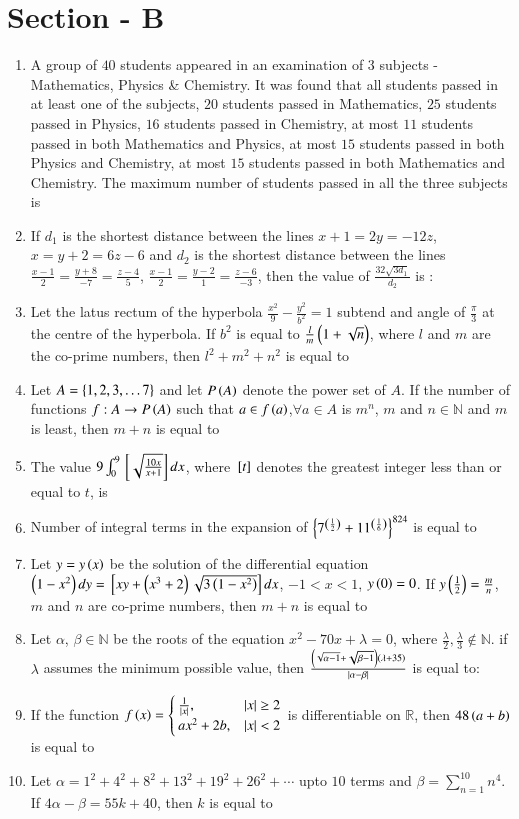 \documentclass[journal]{IEEEtran}
\begin{document}
\section{Section - B}
\begin{enumerate}
	\item A group of $40$ students appeared in an examination of $3$ subjects - Mathematics, Physics \& Chemistry. It was found that all students passed in at least one of the subjects, $20$ students passed in Mathematics, $25$ students passed in Physics, $16$ students passed in Chemistry, at most $11$ students passed in both Mathematics and Physics, at most $15$ students passed in both Physics and Chemistry, at most $15$ students passed in both Mathematics and Chemistry. The maximum number of students passed in all the three subjects is 
	\item If $d_1$ is the shortest distance between the lines $x + 1 = 2y = -12z$, $x = y + 2 = 6z - 6$ and $d_2$ is the shortest distance between the lines $\frac{x-1}{2}=\frac{y+8}{-7}=\frac{z-4}{5}$, $\frac{x-1}{2}=\frac{y-2}{1}=\frac{z-6}{-3}$, then the value of $\frac{32\sqrt{3d_1}}{d_2}$ is :
	\item Let the latus rectum of the hyperbola $\frac{x^2}{9}-\frac{y^2}{b^2}=1$ subtend and angle of $\frac{\pi}{3}$ at the centre of the hyperbola. If $b^2$ is equal to $\frac{l}{m}\left(1+\sqrt{n}\right)$, where $l$ and $m$ are the co-prime numbers, then $l^2+m^2+n^2$ is equal to
	\item Let $A = \left\{1, 2, 3, \dots 7\right\}$ and let $P\left(A\right)$ denote the power set of $A$. If the number of functions $f:A\to P\left(A\right)$ such that $a\in f\left(a\right)$,$\forall a\in A$ is $m^n$, $m$ and $n\in\mathbb{N}$ and $m$ is least, then $m+n$ is equal to
	\item The value $9\int_0^9{}\left[\sqrt{\frac{10x}{x+1}}\right]dx$, where ${}\left[t\right]$ denotes the greatest integer less than or equal to $t$, is 
	\item Number of integral terms in the expansion of $\left\{7^{\left(\frac{1}{2}\right)}+11^{\left(\frac{1}{6}\right)}\right\}^{824}$ is equal to
	\item Let $y = y\left(x\right)$ be the solution of the differential equation $\left(1-x^2\right)dy={}\left[xy+\left(x^3+2\right)\sqrt{3\left(1-x^2\right)}\right]dx$, $-1<x<1$, $y\left(0\right)=0$. If $y\left(\frac{1}{2}\right)=\frac{m}{n}$, $m$ and $n$ are co-prime numbers, then $m+n$ is equal to 
	\item Let $\alpha$, $\beta \in \mathbb{N}$ be the roots of the equation $x^2-70x+\lambda=0$, where $\frac{\lambda}{2},\frac{\lambda}{3}\notin \mathbb{N}$. if $\lambda$ assumes the minimum possible value, then $\frac{\left(\sqrt{\alpha-1}+\sqrt{\beta-1}\right)\left(\lambda+35\right)}{\left\vert\alpha-\beta\right\vert}$ is equal to:
	\item If the function $f\left(x\right) = \begin{cases} \frac{1}{\left\vert x\right\vert},& \left\vert x\right\vert\geq2\\ ax^2+2b,& \left\vert x\right\vert<2\end{cases}$ is differentiable on $\mathbb{R}$, then $48\left(a+b\right)$ is equal to 
	\item Let $\alpha=1^2+4^2+8^2+13^2+19^2+26^2+\cdots$ upto $10$ terms and $\beta=\sum\limits_{n=1}^{10}n^4$. If $4\alpha-\beta=55k+40$, then $k$ is equal to 
\end{enumerate}
\end{document}
